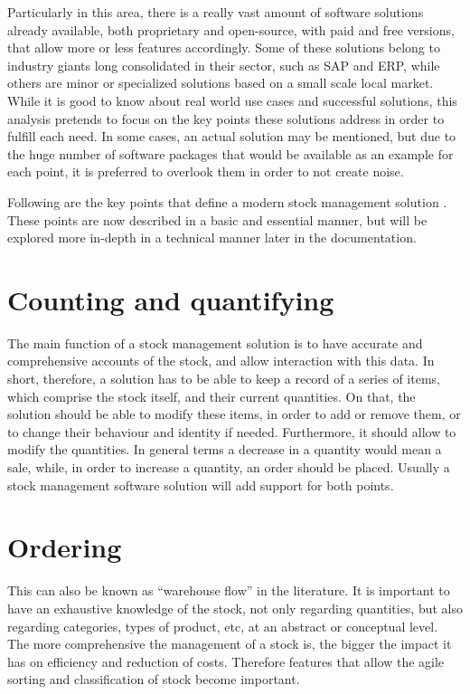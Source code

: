 Particularly in this area, there is a really vast amount of software solutions already available, both proprietary and open-source, with paid and free versions, that allow more or less features accordingly. Some of these solutions belong to industry giants long consolidated in their sector, such as SAP and ERP, while others are minor or specialized solutions based on a small scale local market.
While it is good to know about real world use cases and successful solutions, this analysis pretends to focus on the key points these solutions address in order to fulfill each need. In some cases, an actual solution may be mentioned, but due to the huge number of software packages that would be available as an example for each point, it is preferred to overlook them in order to not create noise.

Following are the key points that define a modern stock management solution \cite{5}. These points are now described in a basic and essential manner, but will be explored more in-depth in a technical manner later in the documentation.

\section{Counting and quantifying}
The main function of a stock management solution is to have accurate and comprehensive accounts of the stock, and allow interaction with this data. In short, therefore, a solution has to be able to keep a record of a series of items, which comprise the stock itself, and their current quantities.
On that, the solution should be able to modify these items, in order to add or remove them, or to change their behaviour and identity if needed.
Furthermore, it should allow to modify the quantities. In general terms a decrease in a quantity would mean a sale, while, in order to increase a quantity, an order should be placed. Usually a stock management software solution will add support for both points.
\section{Ordering}
This can also be known as “warehouse flow” in the literature. It is important to have an exhaustive knowledge of the stock, not only regarding quantities, but also regarding categories, types of product, etc, at an abstract or conceptual level. The more comprehensive the management of a stock is, the bigger the impact it has on efficiency and reduction of costs. Therefore features that allow the agile sorting and classification of stock become important.
